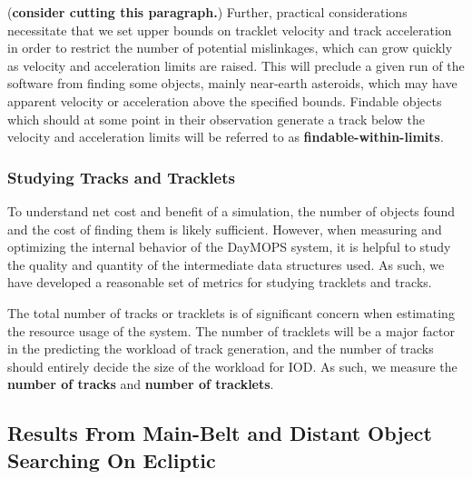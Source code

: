 \documentclass[12pt,preprint]{aastex}
\begin{document}
(\textbf{consider cutting this paragraph.}) Further, practical
considerations necessitate that we set upper bounds on tracklet
velocity and track acceleration in order to restrict the number of
potential mislinkages, which can grow quickly as velocity and
acceleration limits are raised.  This will preclude a given run of the
software from finding some objects, mainly near-earth asteroids, which
may have apparent velocity or acceleration above the specified
bounds. Findable objects which should at some point in their
observation generate a track below the velocity and acceleration
limits will be referred to as \textbf{findable-within-limits}.

\subsubsection{Studying Tracks and Tracklets}

To understand net cost and benefit of a simulation, the number of
objects found and the cost of finding them is likely sufficient.
However, when measuring and optimizing the internal behavior of the
DayMOPS system, it is helpful to study the quality and quantity of the
intermediate data structures used. As such, we have developed a
reasonable set of metrics for studying tracklets and tracks.

The total number of tracks or tracklets is of significant concern when
estimating the resource usage of the system.  The number of tracklets
will be a major factor in the predicting the workload of track
generation, and the number of tracks should entirely decide the size
of the workload for IOD.  As such, we measure the \textbf{number of
  tracks} and \textbf{number of tracklets}.






\subsection{Results From Main-Belt and Distant Object Searching On Ecliptic}
\end{document}
